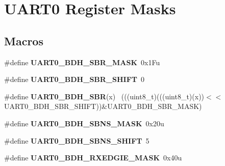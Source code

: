 \hypertarget{group___u_a_r_t0___register___masks}{}\section{U\+A\+R\+T0 Register Masks}
\label{group___u_a_r_t0___register___masks}
\subsection*{Macros}
\begin{DoxyCompactItemize}
\item 
\hypertarget{group___u_a_r_t0___register___masks_ga594b77e6abc9054650d85c9d7e2c4cfa}{}\#define {\bfseries U\+A\+R\+T0\+\_\+\+B\+D\+H\+\_\+\+S\+B\+R\+\_\+\+M\+A\+S\+K}~0x1\+Fu\label{group___u_a_r_t0___register___masks_ga594b77e6abc9054650d85c9d7e2c4cfa}

\item 
\hypertarget{group___u_a_r_t0___register___masks_ga5262e2ab11a18782a8cceb9a63affe27}{}\#define {\bfseries U\+A\+R\+T0\+\_\+\+B\+D\+H\+\_\+\+S\+B\+R\+\_\+\+S\+H\+I\+F\+T}~0\label{group___u_a_r_t0___register___masks_ga5262e2ab11a18782a8cceb9a63affe27}

\item 
\hypertarget{group___u_a_r_t0___register___masks_ga942863cb4a3cc74988807d489e7fb4c8}{}\#define {\bfseries U\+A\+R\+T0\+\_\+\+B\+D\+H\+\_\+\+S\+B\+R}(x)                                              ~(((uint8\+\_\+t)(((uint8\+\_\+t)(x))$<$$<$U\+A\+R\+T0\+\_\+\+B\+D\+H\+\_\+\+S\+B\+R\+\_\+\+S\+H\+I\+F\+T))\&U\+A\+R\+T0\+\_\+\+B\+D\+H\+\_\+\+S\+B\+R\+\_\+\+M\+A\+S\+K)\label{group___u_a_r_t0___register___masks_ga942863cb4a3cc74988807d489e7fb4c8}

\item 
\hypertarget{group___u_a_r_t0___register___masks_gaed905f161d823efa3beca3e0e93d39ff}{}\#define {\bfseries U\+A\+R\+T0\+\_\+\+B\+D\+H\+\_\+\+S\+B\+N\+S\+\_\+\+M\+A\+S\+K}~0x20u\label{group___u_a_r_t0___register___masks_gaed905f161d823efa3beca3e0e93d39ff}

\item 
\hypertarget{group___u_a_r_t0___register___masks_gad8909b0c50ce1d7436a2bdb2d99cce1a}{}\#define {\bfseries U\+A\+R\+T0\+\_\+\+B\+D\+H\+\_\+\+S\+B\+N\+S\+\_\+\+S\+H\+I\+F\+T}~5\label{group___u_a_r_t0___register___masks_gad8909b0c50ce1d7436a2bdb2d99cce1a}

\item 
\hypertarget{group___u_a_r_t0___register___masks_ga345980eca350a190e8fc3e39109a0eea}{}\#define {\bfseries U\+A\+R\+T0\+\_\+\+B\+D\+H\+\_\+\+R\+X\+E\+D\+G\+I\+E\+\_\+\+M\+A\+S\+K}~0x40u\label{group___u_a_r_t0___register___masks_ga345980eca350a190e8fc3e39109a0eea}


\end{DoxyCompactItemize}
